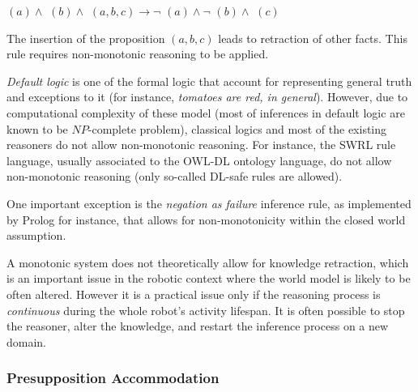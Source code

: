 $(a) \land $  $(b) \land $
$(a, b, c) \to \lnot $ $(a) \land \lnot $
$(b) \land $ $(c)$

The insertion of the proposition $(a, b, c)$ leads to
retraction of other facts. This rule requires non-monotonic reasoning to be
applied.

\emph{Default logic} is one of the formal logic that account for representing
general truth and exceptions to it (for instance, \emph{tomatoes are red, in
general}). However, due to computational complexity of these model (most of
inferences in default logic are known to be $NP$-complete problem), classical
logics and most of the existing reasoners do not allow non-monotonic reasoning.
For instance, the SWRL rule language, usually associated to the OWL-DL ontology
language, do not allow non-monotonic reasoning (only so-called DL-safe rules
are allowed).


One important exception is the \emph{negation as failure} inference rule, as
implemented by {\sc Prolog} for instance, that allows for non-monotonicity
within the closed world assumption.


A monotonic system does not theoretically allow for knowledge retraction,
which is an important issue in the robotic context where the world model is
likely to be often altered.  However it is a practical issue only if the
reasoning process is \emph{continuous} during the whole robot's activity
lifespan. It is often possible to stop the reasoner, alter the knowledge, and
restart the inference process on a new domain.



\subsubsection{Presupposition Accommodation}
\label{sect|presupposition-accommodation}

